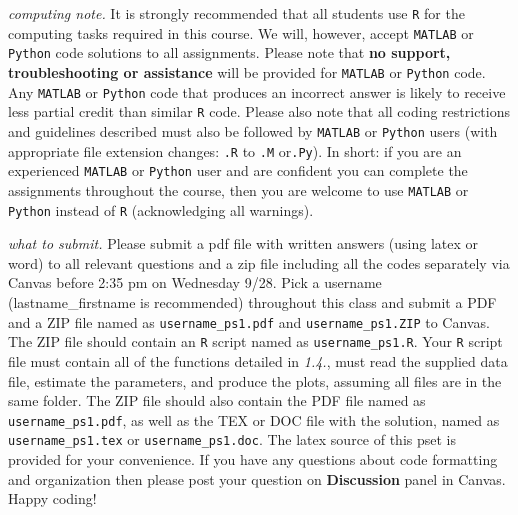 \documentclass[11pt]{article}
\begin{document}
\clearpage

{\em computing note.} It is strongly recommended that all students use \texttt{R} for the computing tasks required in this course. We will, however, accept \texttt{MATLAB} or \texttt{Python} code solutions to all assignments. Please note that \textbf{no support, troubleshooting or assistance} will be provided for \texttt{MATLAB} or \texttt{Python} code. Any \texttt{MATLAB} or \texttt{Python} code that produces an incorrect answer is likely to receive less partial credit than similar \texttt{R} code. Please also note that all coding restrictions and guidelines described must also be followed by \texttt{MATLAB} or \texttt{Python} users (with appropriate file extension changes: \texttt{.R} to \texttt{.M} or\texttt{.Py}). In short: if you are an experienced \texttt{MATLAB} or \texttt{Python} user and are confident you can complete the assignments throughout the course, then you are welcome to use \texttt{MATLAB} or \texttt{Python} instead of \texttt{R} (acknowledging all warnings).

{\em what to submit.} Please submit a pdf file with written answers (using latex or word) to all relevant questions and a zip file including all the codes separately via Canvas before 2:35 pm on Wednesday 9/28. Pick a username (lastname\_firstname is recommended) throughout this class and submit a PDF and a ZIP file named as \texttt{username\_ps1.pdf} and \texttt{username\_ps1.ZIP} to Canvas. The ZIP file should contain an \texttt{R} script named as \texttt{username\_ps1.R}. Your \texttt{R} script file must contain all of the functions detailed in {\em 1.4.}, must read the supplied data file, estimate the parameters, and produce the plots, assuming all files are in the same folder. The ZIP file should also contain the PDF file named as \texttt{username\_ps1.pdf}, as well as the TEX or DOC file with the solution, named as \texttt{username\_ps1.tex} or \texttt{username\_ps1.doc}. The latex source of this pset is provided for your convenience. If you have any questions about code formatting and organization then please post your question on \textbf{Discussion} panel in Canvas. Happy coding! 
\end{document}
